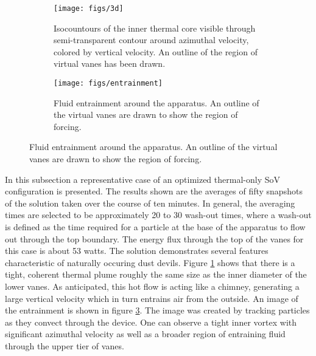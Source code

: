 \begin{figure}[htb]

 \begin{subfigure}{.55\textwidth}
  \centering
  \texttt{[image: figs/3d]}
  \caption{Isocountours of the inner thermal core
  visible through semi-transparent contour around azimuthal velocity,
  colored by vertical velocity. An outline of the region of virtual
  vanes has been drawn.}
  \label{fig:thermal}  
 \end{subfigure}%
 \begin{subfigure}{.4\textwidth}
  \centering
  \texttt{[image: figs/entrainment]}%
  \caption{Fluid entrainment around the apparatus. An outline of the
  virtual vanes are drawn to show the region of forcing.} 
  \label{fig:entrain}  
 \end{subfigure}%
\end{figure}

In this subsection a representative case of an optimized thermal-only SoV
configuration is presented. 
The results shown are the averages of fifty snapshots of the solution 
taken over the course of ten minutes. In general,
the averaging times are selected to be approximately 20 to 30 wash-out 
times, where a
wash-out is defined as the time required for a particle at the base of
the apparatus to flow out through the top boundary. The energy flux
through the top of the vanes for this case is about 53 watts. The solution
demonstrates several features characteristic of naturally occuring dust
devils. Figure \ref{fig:thermal} shows that there is a tight,
coherent thermal plume roughly the same size as the inner diameter of the
lower vanes. As anticipated, this hot flow is acting like a chimney,
generating a large vertical velocity which in turn entrains air from the outside.
An image of the entrainment is shown in figure
\ref{fig:entrain}. The image was created by
tracking particles as they convect through the device. 
One can observe a tight inner vortex with significant azimuthal velocity  
as well as a broader region of entraining fluid through the 
upper tier of vanes. 

